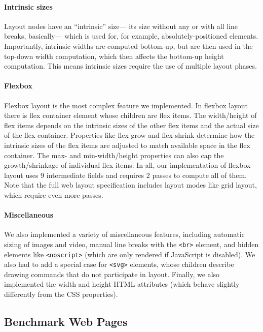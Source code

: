 \paragraph{Intrinsic sizes}
Layout nodes have an ``intrinsic'' size---%
  its size without any or with all line breaks, basically---%
  which is used for, for example, absolutely-positioned elements.
Importantly, intrinsic widths are computed bottom-up,
  but are then used in the top-down width computation,
  which then affects the bottom-up height computation.
This means intrinsic sizes require the use of
  multiple layout phases.

\paragraph{Flexbox}
Flexbox layout is the most complex feature we implemented.
In flexbox layout there is flex container element
  whose children are flex items.
The width/height of flex items depends on
  the intrinsic sizes of the other flex items and
  the actual size of the flex container.
Properties like \textsf{flex-grow} and \textsf{flex-shrink}
  determine how the intrinsic sizes of the flex items
  are adjusted to match available space in the flex container.
The \textsf{max-} and \textsf{min-width}/\textsf{height} properties
  can also cap the growth/shrinkage of individual flex items.
In all, our implementation of flexbox layout
  uses 9 intermediate fields
  and requires 2 passes to compute all of them.
Note that the full web layout specification
  includes layout modes like grid layout,
  which require even more passes.

\paragraph{Miscellaneous}
We also implemented a variety of miscellaneous features,
  including automatic sizing of images and video,
  manual line breaks with the \texttt{<br>} element,
  and hidden elements like \texttt{<noscript>}
  (which are only rendered if JavaScript is disabled).
We also had to add a special case for \texttt{<svg>} elements,
  whose children describe drawing commands
  that do not participate in layout.
Finally, we also implemented the \textsf{width} and \textsf{height}
  HTML attributes
  (which behave slightly differently from the CSS properties).

\subsection{Benchmark Web Pages}

